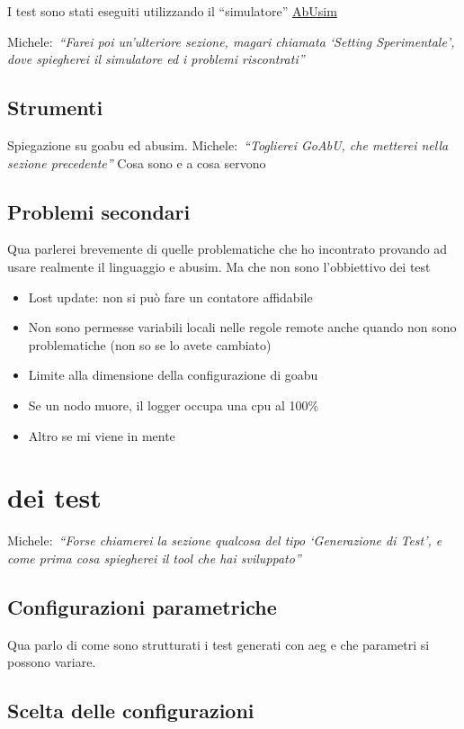 \documentclass{article}
\newcommand{\michele}[1]{{\color{red}Michele:~}{\itshape``{#1}''}}
\begin{document}
I test sono stati eseguiti utilizzando il ``simulatore'' \href{https://github.com/abu-lang/abusim}{AbUsim}

\michele{Farei poi un'ulteriore sezione, magari chiamata `Setting Sperimentale', dove spiegherei il simulatore ed i problemi riscontrati}
\subsection{Strumenti}

Spiegazione su goabu ed abusim. \michele{Toglierei GoAbU, che metterei nella sezione precedente} Cosa sono e a cosa servono

\subsection{Problemi secondari}

Qua parlerei brevemente di quelle problematiche che ho incontrato provando ad usare realmente il linguaggio e abusim. Ma che non sono l'obbiettivo dei test

\begin{itemize}
    \item Lost update: non si può fare un contatore affidabile
    \item Non sono permesse variabili locali nelle regole remote anche quando non sono problematiche (non so se lo avete cambiato)
    \item Limite alla dimensione della configurazione di goabu
    \item Se un nodo muore, il logger occupa una cpu al 100\%
    \item Altro se mi viene in mente
\end{itemize}

\section{ dei test}

\michele{Forse chiamerei la sezione qualcosa del tipo `Generazione di Test', e come prima cosa spiegherei il tool che hai sviluppato}

\subsection{Configurazioni parametriche}

Qua parlo di come sono strutturati i test generati con aeg e che parametri si possono variare.

\subsection{Scelta delle configurazioni}
\end{document}
